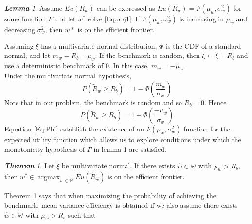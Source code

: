 \documentclass[12pt,oneside,a4paper]{book}
\theoremstyle{definition}
\theoremstyle{remark}
\newtheorem{thm}{\bf Theorem}[subsection]
\newtheorem{lem}{\bf Lemma}[section]
\DeclareMathOperator*{\argmax}{argmax}
\begin{document}
				\begin{lem}\label{lem:mean-eff}\cite{morton2003optimizing}
					Assume $Eu(R_w)$ can be expressed as $Eu(R_w) = F(\mu_w,\sigma_w^2)$ for some function $F$ and let $w^*$ solve \eqref{Eq:obj1}. If $ F(\mu_w,\sigma_w^2)$ is increasing in $\mu_w$ and decreasing $\sigma_w^2$, then $w*$ is on the efficient frontier.
				\end{lem}
				Assuming $\xi$ has a multivariate normal distribution, $\Phi$ is the CDF of a standard normal, and let $m_w = R_b-\mu_w$. If the benchmark is random, then $\tilde{\xi}  \leftarrow \tilde{\xi}-R_b$ and use a deterministic benchmark of 0. In this case, $m_w = -\mu_w$.\\
				Under the multivariate normal hypothesis,
				\begin{equation}\label{Eq:Phi}
					P(\tilde{R}_w \ge R_b) = 1 - \Phi(\frac{m_w}{\sigma_w})
				\end{equation}
				Note that in our problem, the benchmark is random and so $R_b = 0$. Hence
				\begin{equation}\label{Eq:Phi}
					P(\tilde{R}_w \ge R_b) = 1 - \Phi(\frac{-\mu_w}{\sigma_w})
				\end{equation}
				Equation \eqref{Eq:Phi} establish the existence of an $F(\mu_w,\sigma_w^2)$ function for the expected utility function which allows us to explore conditions under which the monotonicity hypothesis of $F$ in lemma 1 are satisfied.

				\begin{thm}\label{thm:argmax_on_eff}\cite{morton2003optimizing}
					Let $\tilde{\xi}$ be multivariate normal. If there exists $\hat{w} \in \mathbb{W}$ with $\mu_{\hat{w}} > R_b$, then $w^* \in  \argmax_{w \in \mathbb{W}} Eu(\tilde{R}_w)$ is on the efficient frontier.\\
				\end{thm}

				Theorem \ref{thm:argmax_on_eff} says that when maximizing the probability of achieving the benchmark, mean-variance efficiency is obtained if we also assume there exists $\hat{w} \in \mathbb{W} \text{ with } \mu_{\hat{w}} > R_b$ such that
\end{document}
